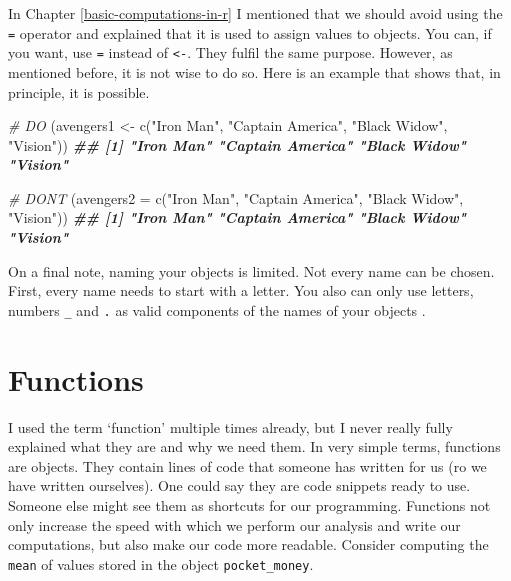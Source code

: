 \documentclass[
]{book}
\newenvironment{Shaded}{\begin{snugshade}}{\end{snugshade}}
\newcommand{\AttributeTok}[1]{\textcolor[rgb]{0.77,0.63,0.00}{#1}}
\newcommand{\CommentTok}[1]{\textcolor[rgb]{0.56,0.35,0.01}{\textit{#1}}}
\newcommand{\DocumentationTok}[1]{\textcolor[rgb]{0.56,0.35,0.01}{\textbf{\textit{#1}}}}
\newcommand{\FunctionTok}[1]{\textcolor[rgb]{0.00,0.00,0.00}{#1}}
\newcommand{\NormalTok}[1]{#1}
\newcommand{\OtherTok}[1]{\textcolor[rgb]{0.56,0.35,0.01}{#1}}
\newcommand{\StringTok}[1]{\textcolor[rgb]{0.31,0.60,0.02}{#1}}
\begin{document}
In Chapter \ref{basic-computations-in-r} I mentioned that we should avoid using the \texttt{=} operator and explained that it is used to assign values to objects. You can, if you want, use \texttt{=} instead of \texttt{\textless{}-}. They fulfil the same purpose. However, as mentioned before, it is not wise to do so. Here is an example that shows that, in principle, it is possible.

\begin{Shaded}
\begin{Highlighting}[]
\CommentTok{\# DO}
\NormalTok{(avengers1 }\OtherTok{\textless{}{-}} \FunctionTok{c}\NormalTok{(}\StringTok{"Iron Man"}\NormalTok{, }\StringTok{"Captain America"}\NormalTok{, }\StringTok{"Black Widow"}\NormalTok{, }\StringTok{"Vision"}\NormalTok{))}
\DocumentationTok{\#\# [1] "Iron Man"        "Captain America" "Black Widow"     "Vision"}

\CommentTok{\# DON\textquotesingle{}T}
\NormalTok{(}\AttributeTok{avengers2 =} \FunctionTok{c}\NormalTok{(}\StringTok{"Iron Man"}\NormalTok{, }\StringTok{"Captain America"}\NormalTok{, }\StringTok{"Black Widow"}\NormalTok{, }\StringTok{"Vision"}\NormalTok{))}
\DocumentationTok{\#\# [1] "Iron Man"        "Captain America" "Black Widow"     "Vision"}
\end{Highlighting}
\end{Shaded}

On a final note, naming your objects is limited. Not every name can be chosen. First, every name needs to start with a letter. You also can only use letters, numbers \texttt{\_} and \texttt{.} as valid components of the names of your objects \citep[see also][Chapter 4.2.]{wickham2016r}.

\hypertarget{functions}{%
\section{Functions}\label{functions}}

I used the term `function' multiple times already, but I never really fully explained what they are and why we need them. In very simple terms, functions are objects. They contain lines of code that someone has written for us (ro we have written ourselves). One could say they are code snippets ready to use. Someone else might see them as shortcuts for our programming. Functions not only increase the speed with which we perform our analysis and write our computations, but also make our code more readable. Consider computing the \texttt{mean} of values stored in the object \texttt{pocket\_money}.
\end{document}
